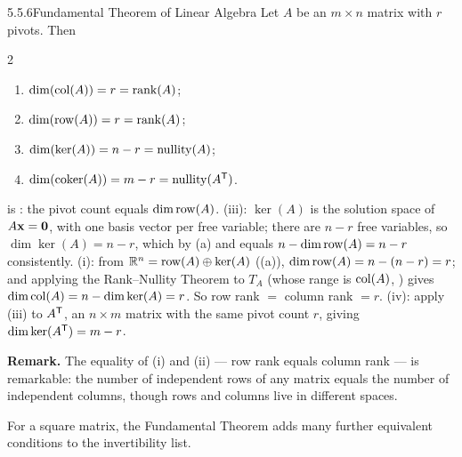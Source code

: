 \begin{thms}{5.5.6}{Fundamental Theorem of Linear Algebra}
Let $A$ be an $m\times n$ matrix with $r$ pivots. Then
\begin{multicols}{2}
\begin{enumerate}[label=\textup{(\roman*)},leftmargin=1.8em,itemsep=1pt]
\item $\operatorname{dim}(\operatorname{col}(A))=r=\operatorname{rank}(A)$;
\item $\operatorname{dim}(\operatorname{row}(A))=r=\operatorname{rank}(A)$;
\item $\operatorname{dim}(\ker(A))=n-r=\operatorname{nullity}(A)$;
\item $\operatorname{dim}(\operatorname{coker}(A))=m-r=\operatorname{nullity}(A^{\mathsf{T}})$.
\end{enumerate}
\end{multicols}
\end{thms}

\begin{prf}
 is : the pivot count equals $\operatorname{dim}\operatorname{row}(A)$. (iii): $\ker(A)$ is the solution space of $A\mathbf{x}=\mathbf{0}$, with one basis vector per free variable; there are $n-r$ free variables, so $\dim\ker(A)=n-r$, which by (a) and  equals $n-\operatorname{dim}\operatorname{row}(A)=n-r$ consistently. (i): from $\mathbb{R}^n=\operatorname{row}(A)\oplus\ker(A)$ ((a)), $\operatorname{dim}\operatorname{row}(A)=n-(n-r)=r$; and applying the Rank--Nullity Theorem to $T_A$ (whose range is $\operatorname{col}(A)$, ) gives $\operatorname{dim}\operatorname{col}(A)=n-\operatorname{dim}\ker(A)=r$. So row rank $=$ column rank $=r$. (iv): apply (iii) to $A^{\mathsf{T}}$, an $n\times m$ matrix with the same pivot count $r$, giving $\operatorname{dim}\ker(A^{\mathsf{T}})=m-r$.
\end{prf}

\begin{rmknote}
\textbf{Remark.}\; The equality of (i) and (ii) --- row rank equals column rank --- is remarkable: the number of independent rows of any matrix equals the number of independent columns, though rows and columns live in different spaces.
\end{rmknote}

For a square matrix, the Fundamental Theorem adds many further equivalent conditions to the invertibility list.

